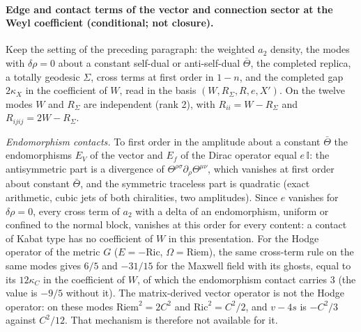 \paragraph{Edge and contact terms of the vector and connection sector at the Weyl coefficient (conditional; not closure).}
Keep the setting of the preceding paragraph: the weighted \(a_2\) density, the modes with \(\delta\rho=0\) about a constant self-dual or anti-self-dual \(\bar\Theta\), the completed replica, a totally geodesic \(\Sigma\), cross terms at first order in \(1-n\), and the completed gap \(2\kappa_X\) in the coefficient of \(W\), read in the basis \((W,R_\Sigma,R,e,X')\). On the twelve modes \(W\) and \(R_\Sigma\) are independent (rank 2), with \(R_{ii}=W-R_\Sigma\) and \(R_{ijij}=2W-R_\Sigma\).

\emph{Endomorphism contacts.} To first order in the amplitude about a constant \(\bar\Theta\) the endomorphisms \(E_V\) of the vector and \(E_f\) of the Dirac operator equal \(e\,\mathbb I\): the antisymmetric part is a divergence of \(\Theta^{\rho\sigma}\partial_\rho\Theta^{\mu\nu}\), which vanishes at first order about constant \(\bar\Theta\), and the symmetric traceless part is quadratic (exact arithmetic, cubic jets of both chiralities, two amplitudes). Since \(e\) vanishes for \(\delta\rho=0\), every cross term of \(a_2\) with a delta of an endomorphism, uniform or confined to the normal block, vanishes at this order for every content: a contact of Kabat type has no coefficient of \(W\) in this presentation. For the Hodge operator of the metric \(G\) (\(E=-\mathrm{Ric}\), \(\Omega=\mathrm{Riem}\)), the same cross-term rule on the same modes gives \(6/5\) and \(-31/15\) for the Maxwell field with its ghosts, equal to its \(12\kappa_C\) in the coefficient of \(W\), of which the endomorphism contact carries \(3\) (the value is \(-9/5\) without it). The matrix-derived vector operator is not the Hodge operator: on these modes \(\mathrm{Riem}^2=2C^2\) and \(\mathrm{Ric}^2=C^2/2\), and \(v-4s\) is \(-C^2/3\) against \(C^2/12\). That mechanism is therefore not available for it.

